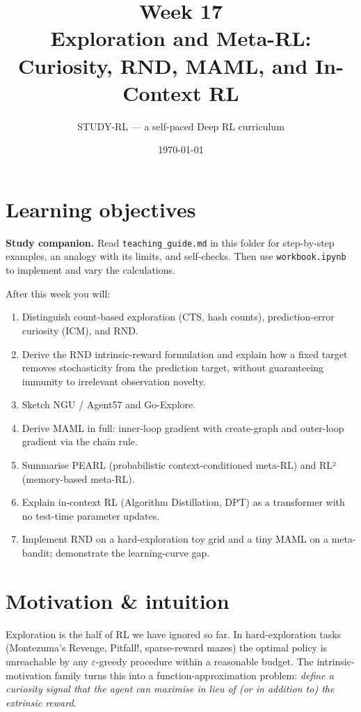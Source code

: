 \documentclass[11pt,oneside]{scrbook}
\title{{\color{rlblue}\textbf{Week 17} \\ \Huge Exploration and Meta-RL: Curiosity, RND, MAML, and In-Context RL}}
\author{STUDY-RL --- a self-paced Deep RL curriculum}
\date{\today}
\begin{document}
\maketitle
\tableofcontents
\newpage

\chapter*{Learning objectives}

\noindent\textbf{Study companion.} Read \texttt{teaching\_guide.md} in this
folder for step-by-step examples, an analogy with its limits, and self-checks.
Then use \texttt{workbook.ipynb} to implement and vary the calculations.
\par\medskip

\begin{keyidea}
After this week you will:
\begin{enumerate}
  \item Distinguish count-based exploration (CTS, hash counts), prediction-error curiosity (ICM), and RND.
  \item Derive the RND intrinsic-reward formulation and explain how a fixed target removes stochasticity from the prediction target, without guaranteeing immunity to irrelevant observation novelty.
  \item Sketch NGU / Agent57 and Go-Explore.
  \item Derive MAML in full: inner-loop gradient with create-graph and outer-loop gradient via the chain rule.
  \item Summarise PEARL (probabilistic context-conditioned meta-RL) and RL² (memory-based meta-RL).
  \item Explain in-context RL (Algorithm Distillation, DPT) as a transformer with no test-time parameter updates.
  \item Implement RND on a hard-exploration toy grid and a tiny MAML on a meta-bandit; demonstrate the learning-curve gap.
\end{enumerate}
\end{keyidea}

\chapter{Motivation \& intuition}

Exploration is the half of RL we have ignored so far.  In hard-exploration tasks (Montezuma's Revenge, Pitfall!, sparse-reward mazes) the optimal policy is unreachable by any $\varepsilon$-greedy procedure within a reasonable budget. The intrinsic-motivation family turns this into a function-approximation problem: \emph{define a curiosity signal that the agent can maximise in lieu of (or in addition to) the extrinsic reward}.
\end{document}
